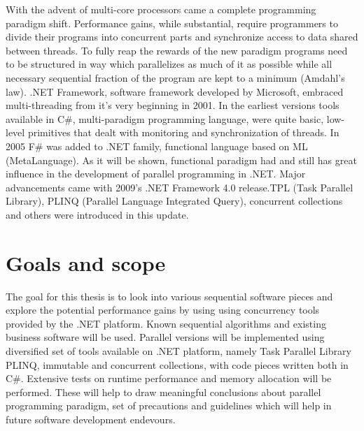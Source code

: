 \newline
With the advent of multi-core processors came a complete programming paradigm shift. Performance gains, while substantial, require programmers to divide their programs into concurrent parts and synchronize access to data shared between threads. To fully reap the rewards of the new paradigm programs need to be structured in way which parallelizes as much of it as possible while all necessary sequential fraction of the program are kept to a minimum (Amdahl's law).
\newline
.NET Framework, software framework developed by Microsoft, embraced multi-threading from it's very beginning in 2001.
In the earliest versions tools available in C\#, multi-paradigm programming language,  were quite basic, low-level primitives that dealt with monitoring and synchronization of threads. In 2005 F\# was added to .NET family, functional language based on ML (MetaLanguage). As it will be shown, functional paradigm had and still has great influence in the development of parallel programming in .NET. Major advancements came with 2009's .NET Framework 4.0 release.TPL (Task Parallel Library), PLINQ (Parallel Language Integrated Query), concurrent collections and others were introduced in this update. 


\section{Goals and scope}

The goal for this thesis is to look into various sequential software pieces
and explore the potential performance gains by using using concurrency tools 
provided by the .NET platform. Known sequential algorithms and existing business software will be used.
\newline
Parallel versions will be implemented using diversified set of tools available on .NET platform, namely
Task Parallel Library PLINQ, immutable and concurrent collections, with code pieces written both
in C\#.
\newline
Extensive tests on runtime performance and memory allocation will be performed. 
These will help to draw meaningful conclusions about parallel programming paradigm, set of precautions
and guidelines which will help in future software development endevours. 

